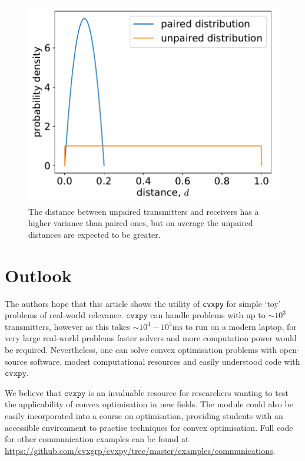 \documentclass[twocolumn,secnumarabic,amssymb, nobibnotes, aps, prl,superscriptaddress]{revtex4-1}
\def\cpp{{C\hspace{-.05em}\raisebox{.4ex}{\tiny\bf ++}}}
\begin{document}
\begin{figure}[h!]
\includegraphics[width=0.9\linewidth]{distance_distributions.pdf}
\caption{\label{fig:dist}The distance between unpaired transmitters and receivers has a higher variance than paired ones, but on average the unpaired distances are expected to be greater.} 
\end{figure}



\section{Outlook}
\noindent The authors hope that this article shows the utility of \texttt{cvxpy} for simple `toy' problems of real-world relevance. $\texttt{cvxpy}$ can handle problems with up to $\sim 10^3$ transmitters, however as this takes $\sim 10^{4}-10^{5}\text{ms}$ to run on a modern laptop, for very large real-world problems faster solvers and more computation power would be required.  Nevertheless, one can solve convex optimisation problems with open-source software, modest computational resources and easily understood code with $\texttt{cvxpy}$.  %

We believe that $\texttt{cvxpy}$ is an invaluable resource for researchers wanting to test the applicability of convex optimisation in new fields. The module could also be easily incorporated into a course on optimisation, providing students with an accessible environment to practise techniques for convex optimisation. Full code for other communication examples can be found at \url{https://github.com/cvxgrp/cvxpy/tree/master/examples/communications}.
\end{document}
